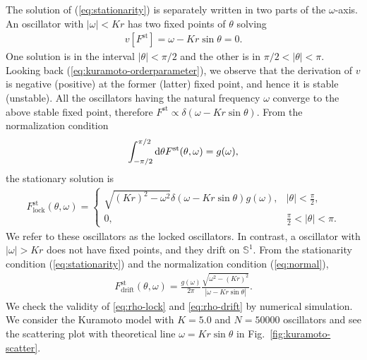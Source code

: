 The solution of (\ref{eq:stationarity}) is separately written in two parts of the $\omega$-axis.
An oscillator with $|\omega|<Kr$ has two fixed points of $\theta$ solving
\begin{align}
  v[F^{\mathrm{st}}]=\omega-Kr\sin\theta=0.
\end{align}
One solution is in the interval $|\theta|<\pi/2$
and the other is in $\pi/2<|\theta|<\pi$.
Looking back (\ref{eq:kuramoto-orderparameter}),
we observe that the derivation of $v$ is negative (positive)
at the former (latter) fixed point,
and hence it is stable (unstable).
All the oscillators having the natural frequency $\omega$ converge to the above stable fixed point,
therefore $F^{\mathrm{st}}\propto\delta(\omega-Kr\sin\theta)$.
From the normalization condition
\begin{align}
  \int_{-\pi/2}^{\pi/2}\mathrm{d}\theta F^{\mathrm{st}}(\theta,\omega)=g(\omega),
\end{align}
the stationary solution is
\begin{eqnarray}
  F^{\mathrm{st}}_{\mathrm{lock}}(\theta,\omega)=\left\{
    \begin{array}{ll}
      \sqrt{(Kr)^{2}-\omega^{2}}\delta(\omega-Kr\sin\theta)g(\omega),&|\theta|<\frac{\pi}{2},\\
      0,&\frac{\pi}{2}<|\theta|<\pi.
  \label{eq:rho-lock}
    \end{array}
  \right.
\end{eqnarray}
We refer to these oscillators as the locked oscillators.
In contrast,
a oscillator with $|\omega|>Kr$ does not have fixed points,
and they drift on $\mathbb{S}^{1}$.
From the stationarity condition (\ref{eq:stationarity}) and the normalization condition (\ref{eq:normal}),
\begin{align}
  F_{\mathrm{drift}}^{\mathrm{st}}(\theta,\omega)=\frac{g(\omega)}{2\pi}\frac{\sqrt{\omega^{2}-(Kr)^{2}}}{|\omega-Kr\sin\theta|}.
  \label{eq:rho-drift}
\end{align}
We check the validity of \eqref{eq:rho-lock} and \eqref{eq:rho-drift} by numerical simulation.
We consider the Kuramoto model with $K=5.0$ and $N=50000$ oscillators and see the scattering plot with theoretical line $\omega=Kr\sin\theta$ in Fig.~\ref{fig:kuramoto-scatter}.
